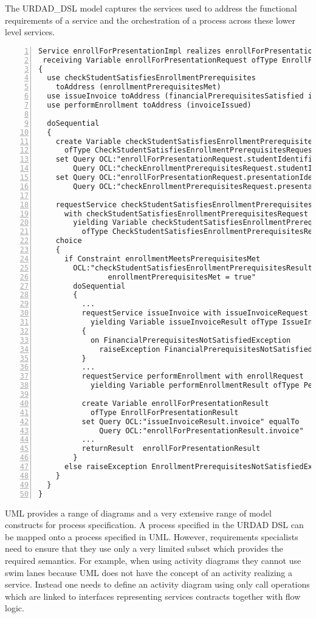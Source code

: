 The URDAD_DSL model captures the services used to address the functional requirements of a service and the orchestration of a process across these lower level services.
\tiny \begin{lstlisting}[numbers=left,escapechar=|]
Service enrollForPresentationImpl realizes enrollForPresentation 
 receiving Variable enrollForPresentationRequest ofType EnrollForPresentationRequest
{
  use checkStudentSatisfiesEnrollmentPrerequisites 
    toAddress (enrollmentPrerequisitesMet)
  use issueInvoice toAddress (financialPrerequisitesSatisfied invoiceIssued) 
  use performEnrollment toAddress (invoiceIssued)
   
  doSequential
  {
    create Variable checkStudentSatisfiesEnrollmentPrerequisitesRequest 
      ofType CheckStudentSatisfiesEnrollmentPrerequisitesRequest               
    set Query OCL:"enrollForPresentationRequest.studentIdentifier" equalTo 
        Query OCL:"checkEnrollmentPrerequisitesRequest.studentIdentifier"
    set Query OCL:"enrollForPresentationRequest.presentationIdentifier" equalTo
        Query OCL:"checkEnrollmentPrerequisitesRequest.presentationIdentifier"
                     
    requestService checkStudentSatisfiesEnrollmentPrerequisites 
      with checkStudentSatisfiesEnrollmentPrerequisitesRequest 
        yielding Variable checkStudentSatisfiesEnrollmentPrerequisitesResult
          ofType CheckStudentSatisfiesEnrollmentPrerequisitesResult
    choice
    {
      if Constraint enrollmentMeetsPrerequisitesMet 
        OCL:"checkStudentSatisfiesEnrollmentPrerequisitesResult.
                enrollmentPrerequisitesMet = true"
        doSequential
        {
          ...
          requestService issueInvoice with issueInvoiceRequest 
            yielding Variable issueInvoiceResult ofType IssueInvoiceResult
          {
            on FinancialPrerequisitesNotSatisfiedException 
              raiseException FinancialPrerequisitesNotSatisfiedException
          }
	      ...
          requestService performEnrollment with enrollRequest 
            yielding Variable performEnrollmentResult ofType PerformEnrollmentResult
          
          create Variable enrollForPresentationResult 
            ofType EnrollForPresentationResult
          set Query OCL:"issueInvoiceResult.invoice" equalTo
              Query OCL:"enrollForPresentationResult.invoice"
          ...                       
          returnResult  enrollForPresentationResult
        }
      else raiseException EnrollmentPrerequisitesNotSatisfiedException
    }
  }
}                 
\end{lstlisting}\normalsize
UML provides a range of diagrams and a very extensive range of model constructs for process specification. A process specified in the URDAD DSL can be mapped onto a process specified in UML. However, requirements specialists need to ensure that they use only a very limited subset which provides the required semantics. For example, when using activity diagrams they cannot use swim lanes because UML does not have the concept of an activity realizing a service. Instead one needs to define an activity diagram using only call operations which are linked to interfaces representing services contracts together with flow logic.

